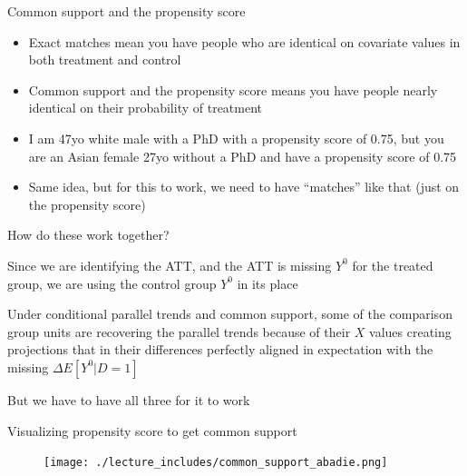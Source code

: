 \documentclass{beamer}
\begin{document}
\begin{frame}{Common support and the propensity score}

\begin{itemize}
\item Exact matches mean you have people who are identical on covariate values in both treatment and control
\item Common support and the propensity score means you have people nearly identical on their probability of treatment
\item I am 47yo white male with a PhD with a propensity score of 0.75, but you are an Asian female 27yo without a PhD and have a propensity score of 0.75
\item Same idea, but for this to work, we need to have ``matches'' like that (just on the propensity score)
\end{itemize}

\end{frame}


\begin{frame}{How do these work together?}

Since we are identifying the ATT, and the ATT is missing $Y^0$ for the treated group, we are using the control group $Y^0$ in its place 

\bigskip

Under conditional parallel trends and common support, some of the comparison group units are recovering the parallel trends because of their $X$ values creating projections that in their differences perfectly aligned in expectation with the missing $\Delta E[Y^0|D=1]$

\bigskip

But we have to have all three for it to work

\end{frame}

\begin{frame}{Visualizing propensity score to get common support}

	\begin{figure}
	\texttt{[image: ./lecture\_includes/common\_support\_abadie.png]}
	\end{figure}

\end{frame}
\end{document}
